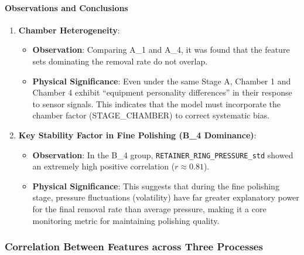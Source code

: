 \documentclass[11pt]{article}
\providecommand{\tightlist}{%
      \setlength{\itemsep}{0pt}\setlength{\parskip}{0pt}}
\begin{document}
    \paragraph{Observations and
Conclusions}\label{observations-and-conclusions}

\begin{enumerate}
\def\labelenumi{\arabic{enumi}.}
\tightlist
\item
  \textbf{Chamber Heterogeneity}:

  \begin{itemize}
  \tightlist
  \item
    \textbf{Observation}: Comparing A\_1 and A\_4, it was found that the
    feature sets dominating the removal rate do not overlap.
  \item
    \textbf{Physical Significance}: Even under the same Stage A, Chamber
    1 and Chamber 4 exhibit ``equipment personality differences'' in
    their response to sensor signals. This indicates that the model must
    incorporate the chamber factor (STAGE\_CHAMBER) to correct
    systematic bias.
  \end{itemize}
\item
  \textbf{Key Stability Factor in Fine Polishing (B\_4 Dominance)}:

  \begin{itemize}
  \tightlist
  \item
    \textbf{Observation}: In the B\_4 group,
    \texttt{RETAINER\_RING\_PRESSURE\_std} showed an extremely high
    positive correlation (\(r \approx 0.81\)).
  \item
    \textbf{Physical Significance}: This suggests that during the fine
    polishing stage, pressure fluctuations (volatility) have far greater
    explanatory power for the final removal rate than average pressure,
    making it a core monitoring metric for maintaining polishing
    quality.
  \end{itemize}
\end{enumerate}

    \subsubsection{Correlation Between Features across Three
Processes}\label{correlation-between-features-across-three-processes}
\end{document}
